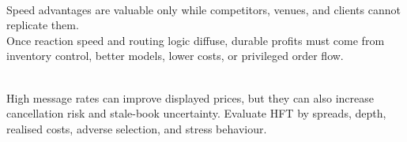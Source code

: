 \documentclass[a4paper,oneside,openany]{book}
\begin{document}
\begin{principle} \\
Speed advantages are valuable only while competitors, venues, and clients cannot replicate them.\\
Once reaction speed and routing logic diffuse, durable profits must come from inventory control, better models, lower costs, or privileged order flow.
\end{principle}

\begin{caveat} \\
High message rates can improve displayed prices, but they can also increase cancellation risk and stale-book uncertainty. Evaluate HFT by spreads, depth, realised costs, adverse selection, and stress behaviour.
\end{caveat}
\end{document}

